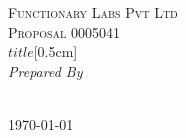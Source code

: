\begin{titlepage}
  \begin{center}

    \textsc{\LARGE Functionary Labs Pvt Ltd}\\[1.5cm]
    \textsc{\Large Proposal 0005041}\\$title$[0.5cm]
\Large \titlename
    \HRule\\[1.5cm]

    \emph{Prepared By}\\[0.1cm]
    \noindent{}\\[1cm]

    \vfill

    {\large \today}

  \end{center}
\end{titlepage}
